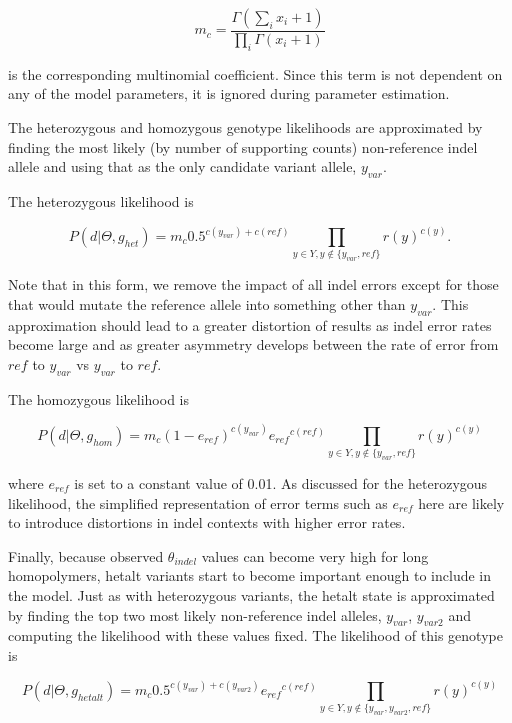 \documentclass{article}
\begin{document}
\begin{equation*}
m_c = \frac{\Gamma(\sum_{i}{x_i + 1})}{\prod_{i}{\Gamma(x_i+1)}}
\end{equation*}

is the corresponding multinomial coefficient. Since this term is not dependent on any of the model parameters, it is ignored during parameter estimation.

The heterozygous and homozygous genotype likelihoods are approximated by finding the most likely (by number of supporting counts) non-reference indel allele and using that as the only candidate variant allele, $y_{var}$.

The heterozygous likelihood is

\begin{equation*}
P (d \vert \Theta, g_{het}) = m_c 0.5^{c(y_{var}) + c(ref)} \prod_{y \in Y, y \not\in \{y_{var},ref\}} r(y)^{c(y)}.
\end{equation*}

Note that in this form, we remove the impact of all indel errors except for those that would mutate the reference allele into something other than $y_{var}$. This approximation should lead to a greater distortion of results as indel error rates become large and as greater asymmetry develops between the rate of error from $ref$ to $y_{var}$ vs $y_{var}$ to $ref$.

The homozygous likelihood is

\begin{equation*}
P (d \vert \Theta, g_{hom}) = m_c (1-e_{ref})^{c(y_{var})} {e_{ref}}^{c(ref)} \prod_{y \in Y, y \not\in \{y_{var},ref\}} r(y)^{c(y)}
\end{equation*}

where $e_{ref}$ is set to a constant value of 0.01. As discussed for the heterozygous likelihood, the simplified representation of error terms such as $e_{ref}$ here are likely to introduce distortions in indel contexts with higher error rates.

Finally, because observed $\theta_{indel}$ values can become very high for long homopolymers, hetalt variants start to become important enough to include in the model. Just as with heterozygous variants, the hetalt state is approximated by finding the top two most likely non-reference indel alleles, $y_{var}$, $y_{var2}$ and computing the likelihood with these values fixed. The likelihood of this genotype is

\begin{equation*}
P (d \vert \Theta, g_{hetalt}) = m_c 0.5^{c(y_{var})+c(y_{var2})} {e_{ref}}^{c(ref)} \prod_{y \in Y, y \not\in \{y_{var},y_{var2},ref\}} r(y)^{c(y)}
\end{equation*}
\end{document}
